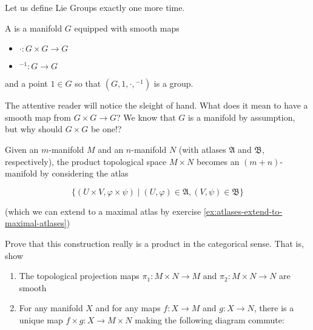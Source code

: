 \documentclass[../main.tex]{subfiles}
\begin{document}
Let us define Lie Groups exactly one more time.

\begin{defn}
  A  is a manifold $G$ equipped with smooth maps 

  \begin{itemize}
      \item $\cdot : G \times G \to G$ 
      \item ${}^{-1} : G \to G$ 
  \end{itemize}

  and a point $1 \in G$ so that $(G,1,\cdot, {}^{-1})$ is a group.
\end{defn}

The attentive reader will notice the sleight of hand. What does it mean
to have a smooth map from $G \times G \to G$? We know that $G$ is a manifold
by assumption, but why should $G \times G$ be one!? 

\begin{defn}
  Given an $m$-manifold $M$ and an $n$-manifold $N$ 
  (with atlases $\mathfrak{A}$ and $\mathfrak{B}$, respectively), the 
  product topological space $M \times N$ becomes an $(m+n)$-manifold by
  considering the atlas

  \[
    \big \{ 
      (U \times V, \varphi \times \psi) 
    \mid 
      (U, \varphi) \in \mathfrak{A}, (V, \psi) \in \mathfrak{B} 
    \big \}
  \]

  (which we can extend to a maximal atlas by exercise 
  \ref{ex:atlases-extend-to-maximal-atlases})

\end{defn}


\begin{ExerciseList}
  \Exercise[label={ex:categorical-product-of-manifolds}]
  Prove that this construction really is a product in the categorical sense. 
  That is, show 

  \begin{enumerate}
    \item The topological projection maps $\pi_1 : M \times N \to M$ and 
      $\pi_2 : M \times N \to N$ are smooth
    \item For any manifold $X$ and for any maps $f : X \to M$ and $g : X \to N$,
      there is a unique map $f \times g : X \to M \times N$ making the following
      diagram commute:
  \end{enumerate}

\end{ExerciseList}
\end{document}
